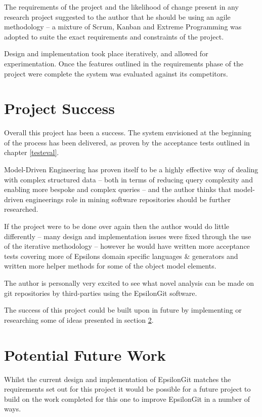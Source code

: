\documentclass[11pt]{book}
\begin{document}
The requirements of the project and the likelihood of change present in any research project suggested to the author that he should be using an agile methodology -- a mixture of Scrum, Kanban and Extreme Programming was adopted to suite the exact requirements and constraints of the project.

Design and implementation took place iteratively, and allowed for experimentation. Once the features outlined in the requirements phase of the project were complete the system was evaluated against its competitors.

\section{Project Success}
Overall this project has been a success. The system envisioned at the beginning of the process has been delivered, as proven by the acceptance tests outlined in chapter \ref{testeval}.

Model-Driven Engineering has proven itself to be a highly effective way of dealing with complex structured data -- both in terms of reducing query complexity and enabling more bespoke and complex queries -- and the author thinks that model-driven engineerings role in mining software repositories should be further researched.

If the project were to be done over again then the author would do little differently -- many design and implementation issues were fixed through the use of the iterative methodology -- however he would have written more acceptance tests covering more of Epsilons domain specific languages \& generators and written more helper methods for some of the object model elements.

The author is personally very excited to see what novel analysis can be made on git repositories by third-parties using the EpsilonGit software.

The success of this project could be built upon in future by implementing or researching some of ideas presented in section \ref{potentialfuturework}.

\section{Potential Future Work}
\label{potentialfuturework}
Whilst the current design and implementation of EpsilonGit matches the requirements set out for this project it would be possible for a future project to build on the work completed for this one to improve EpsilonGit in a number of ways. 
\end{document}
